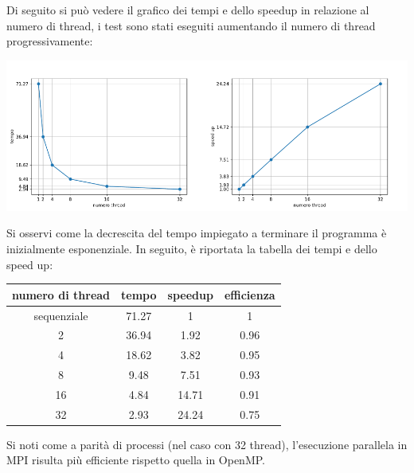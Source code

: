 \documentclass[12pt,openany]{report}
\begin{document}
Di seguito si può vedere il grafico dei tempi e dello speedup in relazione al numero di thread, i test sono stati eseguiti aumentando il numero di thread progressivamente:
\begin{center}
    \includegraphics[width=0.5\textwidth ]{images/tempi_OpenMP.pdf}\includegraphics[width=0.5\textwidth ]{images/speedup_OpenMP.pdf}
\end{center}
Si osservi come la decrescita del tempo impiegato a terminare il programma è inizialmente esponenziale. In seguito, è riportata la tabella dei tempi e dello speed up:
\begin{center}
    \begin{tabular}{|c|c|c|c|}
        \hline
        \rowcolor[HTML]{EFEFEF} 
        numero di  thread & tempo & speedup & efficienza\\ \hline
        sequenziale       & 71.27 & 1       & 1 \\ \hline
        2                 & 36.94 & 1.92    & 0.96 \\ \hline
        4                 & 18.62 & 3.82    & 0.95 \\ \hline
        8                 & 9.48  & 7.51    & 0.93 \\ \hline
        16                & 4.84  & 14.71   & 0.91 \\ \hline
        32                & 2.93  & 24.24   & 0.75 \\ \hline
        \end{tabular}
\end{center}
Si noti come a parità di processi (nel caso con 32 thread), l'esecuzione parallela in MPI risulta più efficiente rispetto quella in OpenMP.
\end{document}
